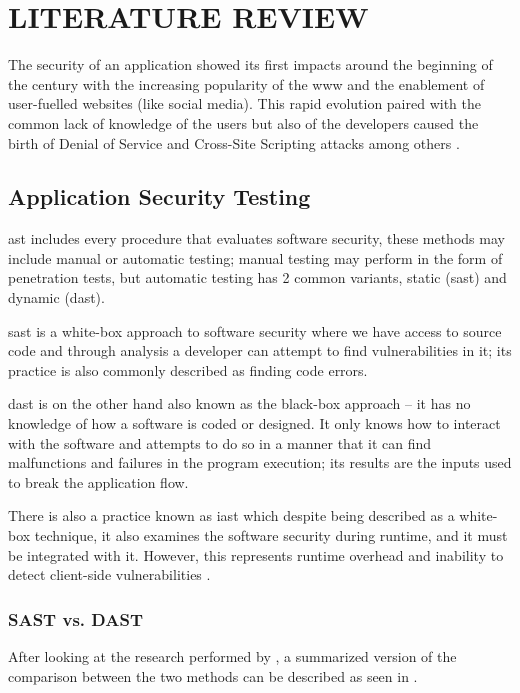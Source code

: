 \chapter{LITERATURE REVIEW} \label{chap:literature_review}
The security of an application showed its first impacts around the beginning of the century with the increasing popularity of the \acrfull{www} and the enablement of user-fuelled websites (like social media). This rapid evolution paired with the common lack of knowledge of the users but also of the developers caused the birth of Denial of Service and Cross-Site Scripting attacks among others \citep{Hoffman2024}.

\section{Application Security Testing}
\acrfull{ast} includes every procedure that evaluates software security, these methods may include manual or automatic testing; manual testing may perform in the form of penetration tests, but automatic testing has 2 common variants, static (\acrshort{sast}) and dynamic (\acrshort{dast}).

\acrlong{sast} is a white-box approach to software security where we have access to source code and through analysis a developer can attempt to find vulnerabilities in it; its practice is also commonly described as finding code errors. 

\acrlong{dast} is on the other hand also known as the black-box approach -- it has no knowledge of how a software is coded or designed. It only knows how to interact with the software and attempts to do so in a manner that it can find malfunctions and failures in the program execution; its results are the inputs used to break the application flow.

There is also a practice known as \acrlong{iast} which despite being described as a white-box technique, it also examines the software security during runtime, and it must be integrated with it. However, this represents runtime overhead and inability to detect client-side vulnerabilities \citep{sast-dast-iast}.

\subsection{SAST vs. DAST}

After looking at the research performed by \citet{SASTvsDAST}, a summarized version of the comparison between the two methods can be described as seen in .


